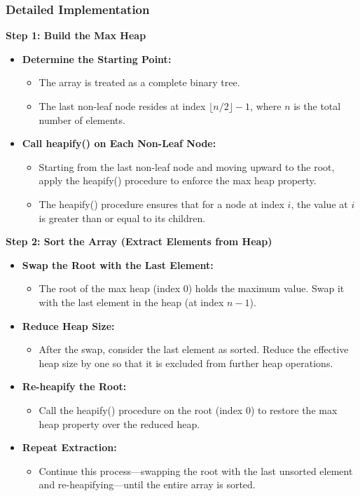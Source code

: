 \subsubsection{Detailed Implementation}

\textbf{Step 1: Build the Max Heap}
\begin{itemize}
    \item \textbf{Determine the Starting Point:}
    \begin{itemize}
        \item The array is treated as a complete binary tree.
        \item The last non-leaf node resides at index $\lfloor n/2 \rfloor - 1$, where $n$ is the total number of elements.
    \end{itemize}
    \item \textbf{Call heapify() on Each Non-Leaf Node:}
    \begin{itemize}
        \item Starting from the last non-leaf node and moving upward to the root, apply the heapify() procedure to enforce the max heap property.
        \item The heapify() procedure ensures that for a node at index $i$, the value at $i$ is greater than or equal to its children.
    \end{itemize}
\end{itemize}

\textbf{Step 2: Sort the Array (Extract Elements from Heap)}
\begin{itemize}
    \item \textbf{Swap the Root with the Last Element:}
    \begin{itemize}
        \item The root of the max heap (index 0) holds the maximum value. Swap it with the last element in the heap (at index $n-1$).
    \end{itemize}
    \item \textbf{Reduce Heap Size:}
    \begin{itemize}
        \item After the swap, consider the last element as sorted. Reduce the effective heap size by one so that it is excluded from further heap operations.
    \end{itemize}
    \item \textbf{Re-heapify the Root:}
    \begin{itemize}
        \item Call the heapify() procedure on the root (index 0) to restore the max heap property over the reduced heap.
    \end{itemize}
    \item \textbf{Repeat Extraction:}
    \begin{itemize}
        \item Continue this process—swapping the root with the last unsorted element and re-heapifying—until the entire array is sorted.
    \end{itemize}
\end{itemize}

